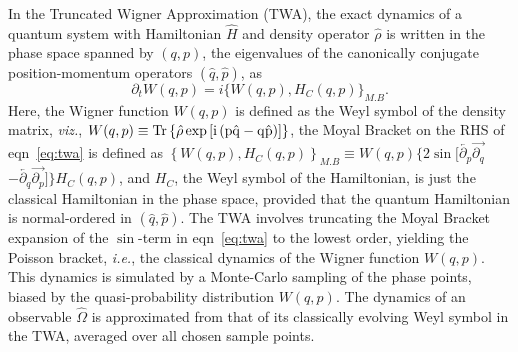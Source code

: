 \documentclass[extendedabs]{bmvc2k}
\begin{document}
In the Truncated Wigner Approximation (TWA), the exact dynamics of a quantum system with Hamiltonian $\hat{H}$ and density operator $\hat{\rho}$ is written in the phase space spanned by $(q,p)$, the eigenvalues of the canonically conjugate position-momentum operators $(\hat{q},\hat{p})$, as
\begin{equation}
\label{eq:twa}
\partial_t W(q,p) = i \bigg\{W(q,p),H_C(q,p)\bigg\}_{M.B}.
\end{equation}
Here, the Wigner function $W(q,p)$ is defined as the Weyl symbol of the density matrix, \textit{viz.}, $W(q,p) \equiv \rm{Tr}\left\{\hat{\rho} \exp{\left[i\left(p\hat{q}-q\hat{p}\right) \right]}\right\}$, the Moyal Bracket on the RHS of eqn~\ref{eq:twa} is defined as $\left\{W(q,p),H_C(q,p)\right\}_{M.B}\equiv W(q,p)\{2\sin[\overleftarrow{\partial_p}\overrightarrow{\partial_q}$
$-\overleftarrow{\partial_q}\overrightarrow{\partial_p}]\}H_C(q,p)$, and $H_C$, the Weyl symbol of the Hamiltonian, is just the classical Hamiltonian in the phase space, provided that the quantum Hamiltonian is normal-ordered in $(\hat{q},\hat{p})$. The TWA involves truncating the Moyal Bracket expansion of the $\sin$-term in eqn~\ref{eq:twa} to the lowest order, yielding the Poisson bracket, \textit{i.e.}, the classical dynamics of the Wigner function $W(q,p)$. This dynamics is simulated by a Monte-Carlo sampling of the phase points, biased by the quasi-probability distribution $W(q,p)$. The dynamics of an observable $\hat{\Omega}$ is approximated from that of its classically evolving Weyl symbol in the TWA, averaged over all chosen sample points.
\end{document}
